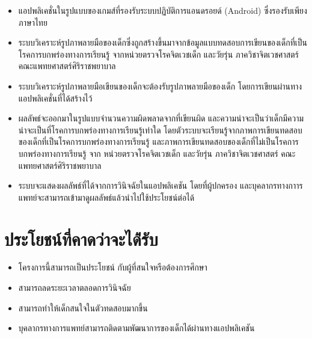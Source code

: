 \documentclass[12pt,oneside,openright,a4paper]{cpe-thai-project}
\begin{document}
\begin{itemize}
\item  แอปพลิเคชั่นในรูปแบบของเกมส์ที่รองรับระบบปฏิบัติการแอนดรอยด์ (Android) ซึ่งรองรับเพียงภาษาไทย 
\item  ระบบวิเคราะห์รูปภาพลายมือของเด็กซึ่งถูกสร้างขึ้นมาจากข้อมูลแบบทดสอบการเขียนของเด็กที่เป็นโรคการบกพร่องทางการเรียนรู้ จากหน่วยตรวจโรคจิตเวชเด็ก และวัยรุ่น ภาควิชาจิตเวชศาสตร์ คณะแพทยศาสตร์ศิริราชพยาบาล
\item  ระบบวิเคราะห์รูปภาพลายมือเขียนของเด็กจะต้องรับรูปภาพลายมือของเด็ก โดยการเขียนผ่านทางแอปพลิเคชั่นที่ได้สร้างไว้
\item  ผลลัพธ์จะออกมาในรูปแบบจำนวนความผิดพลาดจากที่เขียนผิด และความน่าจะเป็นว่าเด็กมีความน่าจะเป็นที่โรคการบกพร่องทางการเรียนรู้เท่าใด โดยตัวระบบจะเรียนรู้จากภาพการเขียนทดสอบของเด็กที่เป็นโรคการบกพร่องทางการเรียนรู้ และภาพการเขียนทดสอบของเด็กที่ไม่เป็นโรคการบกพร่องทางการเรียนรู้ จาก หน่วยตรวจโรคจิตเวชเด็ก และวัยรุ่น ภาควิชาจิตเวชศาสตร์ คณะแพทยศาสตร์ศิริราชพยาบาล
\item  ระบบจะแสดงผลลัพธ์ที่ได้จากการวินิจฉัยในแอปพลิเคชัน โดยที่ผู้ปกครอง และบุคลากรทางกาารแพทย์จะสามารถเข้ามาดูผลลัพธ์แล้วนำไปใช้ประโยชน์ต่อได้
\end{itemize}

\section{ประโยชน์ที่คาดว่าจะได้่รับ}
\begin{itemize}
  \item โครงการนี้สามารถเป็นประโยชน์ กับผู้ที่สนใจหรือต้องการศึกษา
  \item สามารถลดระยะเวลาตลอดการวินิจฉัย
  \item สามารถทำให้เด็กสนใจในตัวทดสอบมากขึ้น
  \item บุคลากรทางการแพทย์สามารถติดตามพัฒนาการของเด็กได้ผ่านทางแอปพลิเคชัน
\end{itemize}
\end{document}
